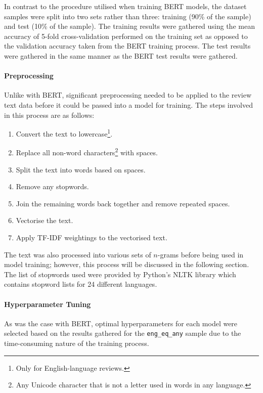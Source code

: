 In contrast to the procedure utilised when training BERT models, the dataset samples were split into two sets rather than three: training (90\% of the sample) and test (10\% of the sample). The training results were gathered using the mean accuracy of 5-fold cross-validation performed on the training set as opposed to the validation accuracy taken from the BERT training process. The test results were gathered in the same manner as the BERT test results were gathered.

\paragraph{Preprocessing}

Unlike with BERT, significant preprocessing needed to be applied to the review text data before it could be passed into a model for training. The steps involved in this process are as follows:

\begin{enumerate}
    \item Convert the text to lowercase\footnote{Only for English-language reviews.}.
    \item Replace all non-word characters\footnote{Any Unicode character that is not a letter used in words in any language.} with spaces.
    \item Split the text into words based on spaces.
    \item Remove any stopwords.
    \item Join the remaining words back together and remove repeated spaces.
    \item Vectorise the text.
    \item Apply TF-IDF weightings to the vectorised text.
\end{enumerate}

The text was also processed into various sets of $n$-grams before being used in model training; however, this process will be discussed in the following section. The list of stopwords used were provided by Python's NLTK library \cite{bird2009natural} which contains stopword lists for 24 different languages.

\paragraph{Hyperparameter Tuning}

As was the case with BERT, optimal hyperparameters for each model were selected based on the results gathered for the \texttt{eng\_eq\_any} sample due to the time-consuming nature of the training process.

